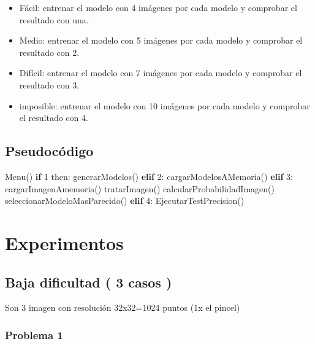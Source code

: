\documentclass[
  spanish,
]{article}
\newenvironment{Shaded}{}{}
\newcommand{\ControlFlowTok}[1]{\textcolor[rgb]{0.00,0.44,0.13}{\textbf{#1}}}
\newcommand{\DecValTok}[1]{\textcolor[rgb]{0.25,0.63,0.44}{#1}}
\newcommand{\NormalTok}[1]{#1}
\providecommand{\tightlist}{%
  \setlength{\itemsep}{0pt}\setlength{\parskip}{0pt}}
\begin{document}
\begin{itemize}
\tightlist
\item
  Fácil: entrenar el modelo con 4 imágenes por cada modelo y comprobar
  el resultado con una.
\item
  Medio: entrenar el modelo con 5 imágenes por cada modelo y comprobar
  el resultado con 2.
\item
  Difícil: entrenar el modelo con 7 imágenes por cada modelo y comprobar
  el resultado con 3.
\item
  imposible: entrenar el modelo con 10 imágenes por cada modelo y
  comprobar el resultado con 4.
\end{itemize}

\hypertarget{pseudocuxf3digo}{%
\subsection{Pseudocódigo}\label{pseudocuxf3digo}}

\begin{Shaded}
\begin{Highlighting}[]
\NormalTok{Menu()}
    \ControlFlowTok{if} \DecValTok{1}\NormalTok{ then:}
\NormalTok{        generarModelos()}
    \ControlFlowTok{elif} \DecValTok{2}\NormalTok{:}
\NormalTok{        cargarModelosAMemoria()}
    \ControlFlowTok{elif} \DecValTok{3}\NormalTok{:}
\NormalTok{        cargarImagenAmemoria()}
\NormalTok{        tratarImagen()}
\NormalTok{        calcularProbabilidadImagen()}
\NormalTok{        seleccionarModeloMasParecido()}
   \ControlFlowTok{elif} \DecValTok{4}\NormalTok{:}
\NormalTok{        EjecutarTestPrecision()}
\end{Highlighting}
\end{Shaded}

\hypertarget{experimentos}{%
\section{Experimentos}\label{experimentos}}

\hypertarget{baja-dificultad-3-casos}{%
\subsection{Baja dificultad ( 3 casos )}\label{baja-dificultad-3-casos}}

Son 3 imagen con resolución 32x32=1024 puntos (1x el pincel)

\hypertarget{problema-1}{%
\subsubsection{Problema 1}\label{problema-1}}
\end{document}
